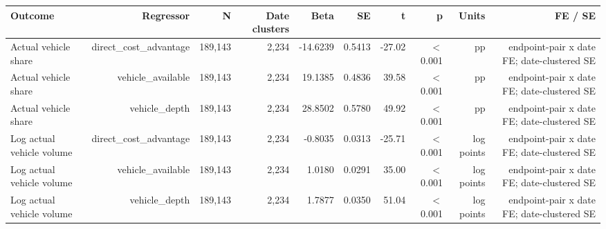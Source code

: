 \begin{tabular}{lrrrrrrrrr}
\toprule
Outcome & Regressor & N & Date clusters & Beta & SE & t & p & Units & FE / SE \\
\midrule
Actual vehicle share & direct\_cost\_advantage & 189,143 & 2,234 & -14.6239 & 0.5413 & -27.02 & \ensuremath{<}0.001 & pp & endpoint-pair x date FE; date-clustered SE \\
Actual vehicle share & vehicle\_available & 189,143 & 2,234 & 19.1385 & 0.4836 & 39.58 & \ensuremath{<}0.001 & pp & endpoint-pair x date FE; date-clustered SE \\
Actual vehicle share & vehicle\_depth & 189,143 & 2,234 & 28.8502 & 0.5780 & 49.92 & \ensuremath{<}0.001 & pp & endpoint-pair x date FE; date-clustered SE \\
Log actual vehicle volume & direct\_cost\_advantage & 189,143 & 2,234 & -0.8035 & 0.0313 & -25.71 & \ensuremath{<}0.001 & log points & endpoint-pair x date FE; date-clustered SE \\
Log actual vehicle volume & vehicle\_available & 189,143 & 2,234 & 1.0180 & 0.0291 & 35.00 & \ensuremath{<}0.001 & log points & endpoint-pair x date FE; date-clustered SE \\
Log actual vehicle volume & vehicle\_depth & 189,143 & 2,234 & 1.7877 & 0.0350 & 51.04 & \ensuremath{<}0.001 & log points & endpoint-pair x date FE; date-clustered SE \\
\bottomrule
\end{tabular}
